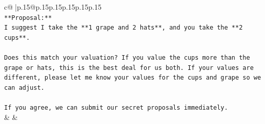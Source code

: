 \documentclass{article}
\begin{document}
{\begin{supertabular}{c@{$\;$}|p{.15\linewidth}@{}p{.15\linewidth}p{.15\linewidth}p{.15\linewidth}p{.15\linewidth}p{.15\linewidth}}
{{{\\ 
\texttt{**Proposal:**} \\
\texttt{I suggest I take the **1 grape and 2 hats**, and you take the **2 cups**.} \\
\\ 
\texttt{Does this match your valuation? If you value the cups more than the grape or hats, this is the best deal for us both. If your values are different, please let me know your values for the cups and grape so we can adjust.} \\
\\ 
\texttt{If you agree, we can submit our secret proposals immediately.} \\
            }
        }
    }
    & & \\ \\


\end{supertabular}}
\end{document}
